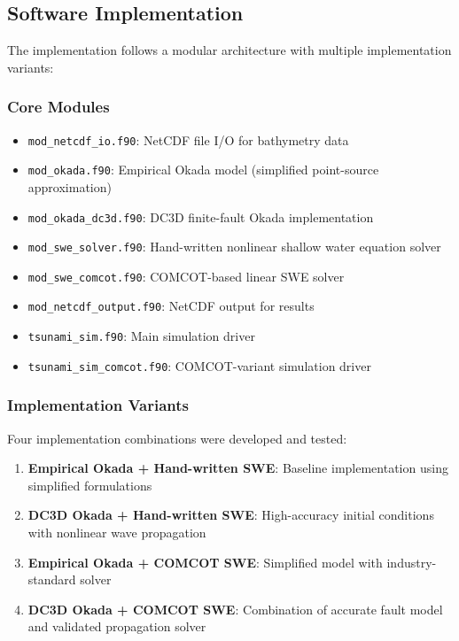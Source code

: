 \documentclass[12pt]{article}
\begin{document}
\subsection{Software Implementation}

The implementation follows a modular architecture with multiple implementation variants:

\subsubsection{Core Modules}
\begin{itemize}
    \item \texttt{mod\_netcdf\_io.f90}: NetCDF file I/O for bathymetry data
    \item \texttt{mod\_okada.f90}: Empirical Okada model (simplified point-source approximation)
    \item \texttt{mod\_okada\_dc3d.f90}: DC3D finite-fault Okada implementation \cite{okada1985}
    \item \texttt{mod\_swe\_solver.f90}: Hand-written nonlinear shallow water equation solver
    \item \texttt{mod\_swe\_comcot.f90}: COMCOT-based linear SWE solver \cite{comcot,comcot_gfortran}
    \item \texttt{mod\_netcdf\_output.f90}: NetCDF output for results
    \item \texttt{tsunami\_sim.f90}: Main simulation driver
    \item \texttt{tsunami\_sim\_comcot.f90}: COMCOT-variant simulation driver
\end{itemize}

\subsubsection{Implementation Variants}

Four implementation combinations were developed and tested:

\begin{enumerate}
    \item \textbf{Empirical Okada + Hand-written SWE}: Baseline implementation using simplified formulations
    \item \textbf{DC3D Okada + Hand-written SWE}: High-accuracy initial conditions with nonlinear wave propagation
    \item \textbf{Empirical Okada + COMCOT SWE}: Simplified model with industry-standard solver
    \item \textbf{DC3D Okada + COMCOT SWE}: Combination of accurate fault model and validated propagation solver
\end{enumerate}
\end{document}
